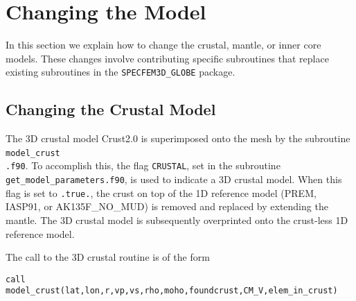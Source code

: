 \chapter{Changing the Model}\label{cha:-Changing-the}

In this section we explain how to change the crustal, mantle, or inner
core models. These changes involve contributing specific subroutines
that replace existing subroutines in the \texttt{SPECFEM3D\_GLOBE}
package.


\section{Changing the Crustal Model}\label{sec:Changing-the-Crustal}

The 3D crustal model Crust2.0 \citep{BaLaMa00} is superimposed onto
the mesh by the subroutine \texttt{model\_crust}~\\
\texttt{.f90}. To accomplish this, the flag \texttt{CRUSTAL}, set
in the subroutine \texttt{get\_model\_parameters.f90}, is used
to indicate a 3D crustal model. When this flag is set to \texttt{.true.},
the crust on top of the 1D reference model (PREM, IASP91, or AK135F\_NO\_MUD)
is removed and replaced by extending the mantle. The 3D crustal model
is subsequently overprinted onto the crust-less 1D reference model.\newline


The call to the 3D crustal routine is of the form
\begin{verbatim}
call model_crust(lat,lon,r,vp,vs,rho,moho,foundcrust,CM_V,elem_in_crust)
\end{verbatim}

